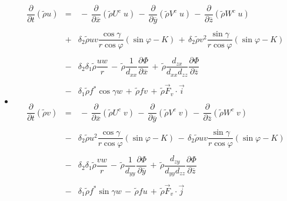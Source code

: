 \begin{itemize}
\item{}
\begin{eqnarray}
\dfrac{\partial}{\partial t}(\tilde{\rho}  u ) &= &
 \, - \, \dfrac{\partial }{\partial \overline{x}} (\tilde{\rho} U^{c} \;   u )
 \, - \, \dfrac{\partial }{\partial \overline{y}} (\tilde{\rho} V^{c} \;   u )
 \, - \, \dfrac{\partial }{\partial \overline{z}} (\tilde{\rho} W^{c} \;   u )
\nonumber \\
& & \nonumber \\
&  + & \delta _{2}\tilde{\rho}  u   v  \dfrac{ \cos\gamma}{r \cos\varphi} (\sin\varphi -K)
\,+ \,\delta _{2}\tilde{\rho}  v ^{2}  \dfrac{ \sin\gamma  }{r \cos \varphi} (\sin\varphi -K)
\nonumber \\
& & \nonumber \\
 & - &\delta _{2}\delta _{1} \tilde{\rho}\dfrac{ u  w}{r} \,  - \,
  \tilde{\rho}\dfrac{1}{d_{xx}}
\dfrac{\partial \Phi}{\partial \overline{x}}
\, + \,\tilde{\rho}\dfrac{d_{zx}}{d_{xx}d_{zz}}
\dfrac{\partial \Phi}{\partial \overline{z}} \nonumber \\
& & \nonumber \\
&  - &\delta _{1} \tilde{\rho} f^* \cos\gamma w \, +  \, \tilde{\rho} f  v
\, + \, \tilde{\rho} \vec{F}_{v} \cdot \vec{i}
\\
& & \nonumber \\
\dfrac{\partial}{\partial t}(\tilde{\rho}  v ) &= &
 \, - \, \dfrac{\partial }{\partial \overline{x}} (\tilde{\rho} U^{c} \;   v )
 \, - \, \dfrac{\partial }{\partial \overline{y}} (\tilde{\rho} V^{c} \;   v )
 \, - \, \dfrac{\partial }{\partial \overline{z}} (\tilde{\rho} W^{c} \;   v )
\nonumber \\ & & \nonumber \\
&  - & \delta _{2}\tilde{\rho}  u ^{2}  \dfrac{ \cos\gamma}{r \cos\varphi} (\sin\varphi -K)
 \, - \, \delta _{2}\tilde{\rho}  u   v   \dfrac{\sin\gamma}{r \cos \varphi} (\sin\varphi -K)
\nonumber \\ & & \nonumber \\
 & - & \delta _{2}\delta _{1} \tilde{\rho}\dfrac{ v  w}{r} \,  - \,
 \tilde{\rho}\dfrac{1}{d_{yy}}
\dfrac{\partial \Phi}{\partial \overline{y}}
 \, +  \, \tilde{\rho}\dfrac{d_{zy}}{d_{yy}d_{zz}}
\dfrac{\partial \Phi}{\partial \overline{z}} \nonumber \\
& & \nonumber \\
&  - &\delta _{1}\tilde{\rho} f^* \sin\gamma w  \, - \,  \tilde{\rho} f  u
 \, + \, \tilde{\rho} \vec{F}_{v} \cdot \vec{j}
\\

\end{eqnarray}
\end{itemize}
